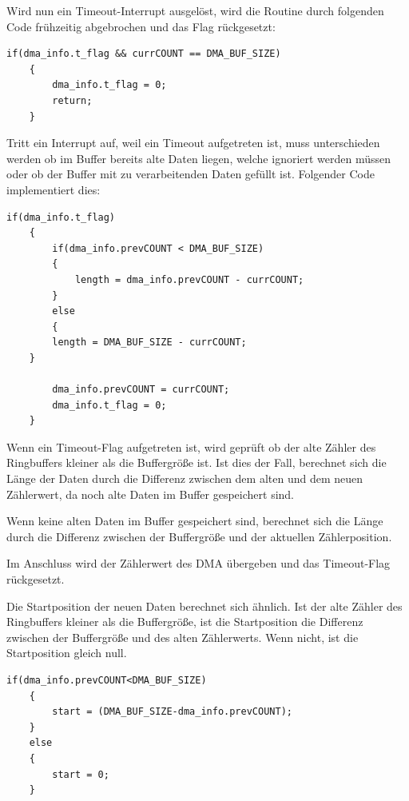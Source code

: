   \newpage
  
  Wird nun ein Timeout-Interrupt ausgelöst, wird die Routine durch folgenden Code frühzeitig abgebrochen und das Flag rückgesetzt:
  \begin{lstlisting}[caption={\textit{Abbruch Timeoutinterrupt}}]
    if(dma_info.t_flag && currCOUNT == DMA_BUF_SIZE)
    {
        dma_info.t_flag = 0;
        return;
    }
  \end{lstlisting}

  \smallskip

  Tritt ein Interrupt auf, weil ein Timeout aufgetreten ist, muss unterschieden werden ob im Buffer bereits alte Daten liegen, welche ignoriert
  werden müssen oder ob der Buffer mit zu verarbeitenden Daten gefüllt ist. Folgender Code implementiert dies:

  \begin{lstlisting}[caption={\textit{Längenberechnung Timeout}}]
    if(dma_info.t_flag)
    {
    	if(dma_info.prevCOUNT < DMA_BUF_SIZE)
    	{
    		length = dma_info.prevCOUNT - currCOUNT;
    	}
    	else
    	{
  		length = DMA_BUF_SIZE - currCOUNT;
  	}

        dma_info.prevCOUNT = currCOUNT;
        dma_info.t_flag = 0;
    }
  \end{lstlisting}

  Wenn ein Timeout-Flag aufgetreten ist, wird geprüft ob der alte Zähler des Ringbuffers kleiner als die Buffergröße ist. Ist dies der Fall, berechnet
  sich die Länge der Daten durch die Differenz zwischen dem alten und dem neuen Zählerwert, da noch alte Daten im Buffer gespeichert sind.
  
  Wenn keine alten Daten im Buffer gespeichert sind, berechnet sich die Länge durch die Differenz zwischen der Buffergröße und der aktuellen Zählerposition.

  \smallskip

  Im Anschluss wird der Zählerwert des \ac{DMA} übergeben und das Timeout-Flag rückgesetzt.

  \newpage

  Die Startposition der neuen Daten berechnet sich ähnlich. Ist der alte Zähler des Ringbuffers kleiner als die Buffergröße, ist die Startposition
  die Differenz zwischen der Buffergröße und des alten Zählerwerts. Wenn nicht, ist die Startposition gleich null.

  \begin{lstlisting}[caption={\textit{Berechnung Startposition}}]
    if(dma_info.prevCOUNT<DMA_BUF_SIZE)
    {
    	start = (DMA_BUF_SIZE-dma_info.prevCOUNT);
    }
    else
    {
    	start = 0;
    }  
  \end{lstlisting}

